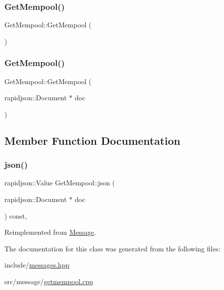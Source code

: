 \subsubsection{\texorpdfstring{Get\+Mempool()}{GetMempool()}\hspace{0.1cm}{\footnotesize\ttfamily [1/2]}}
{\footnotesize\ttfamily Get\+Mempool\+::\+Get\+Mempool (\begin{DoxyParamCaption}{ }\end{DoxyParamCaption})}

\mbox{\label{classGetMempool_a99f4e2b501cd290d13833116aa48e0f7}} 
\subsubsection{\texorpdfstring{Get\+Mempool()}{GetMempool()}\hspace{0.1cm}{\footnotesize\ttfamily [2/2]}}
{\footnotesize\ttfamily Get\+Mempool\+::\+Get\+Mempool (\begin{DoxyParamCaption}\item[{rapidjson\+::\+Document $\ast$}]{doc }\end{DoxyParamCaption})\hspace{0.3cm}{\ttfamily [explicit]}}



\subsection{Member Function Documentation}
\mbox{\label{classGetMempool_a3e6fb495c609ade4e8efd3d5668c28cf}} 
\subsubsection{\texorpdfstring{json()}{json()}}
{\footnotesize\ttfamily rapidjson\+::\+Value Get\+Mempool\+::json (\begin{DoxyParamCaption}\item[{rapidjson\+::\+Document $\ast$}]{doc }\end{DoxyParamCaption}) const\hspace{0.3cm}{\ttfamily [override]}, {\ttfamily [virtual]}}



Reimplemented from \mbox{\hyperlink{classMessage_a6f8e3ac2eed3a8afe9400fcd5b3447b2}{Message}}.



The documentation for this class was generated from the following files\+:\begin{DoxyCompactItemize}
\item 
include/\mbox{\hyperlink{messages_8hpp}{messages.\+hpp}}\item 
src/message/\mbox{\hyperlink{getmempool_8cpp}{getmempool.\+cpp}}\end{DoxyCompactItemize}
